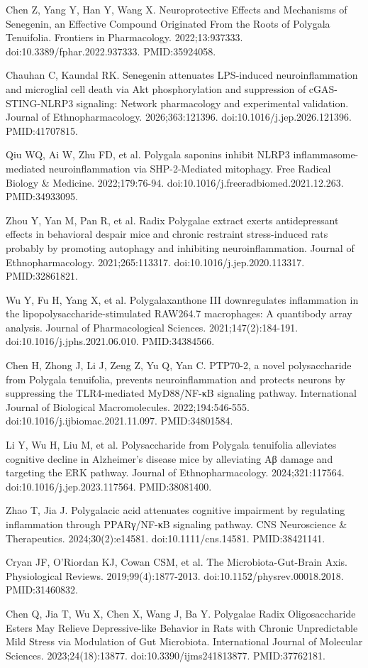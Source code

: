 \documentclass[11pt,oneside]{book}
\newcommand{\reff}[2]{\par\hangindent=7mm\hangafter=1\noindent[#1]\hspace{2mm}#2\par}
\begin{document}
\reff{12}{Chen Z, Yang Y, Han Y, Wang X. Neuroprotective Effects and Mechanisms of Senegenin, an Effective Compound Originated From the Roots of Polygala Tenuifolia. Frontiers in Pharmacology. 2022;13:937333. doi:10.3389/fphar.2022.937333. PMID:35924058.}
\reff{13}{Chauhan C, Kaundal RK. Senegenin attenuates LPS-induced neuroinflammation and microglial cell death via Akt phosphorylation and suppression of cGAS-STING-NLRP3 signaling: Network pharmacology and experimental validation. Journal of Ethnopharmacology. 2026;363:121396. doi:10.1016/j.jep.2026.121396. PMID:41707815.}
\reff{14}{Qiu WQ, Ai W, Zhu FD, et al. Polygala saponins inhibit NLRP3 inflammasome-mediated neuroinflammation via SHP-2-Mediated mitophagy. Free Radical Biology \& Medicine. 2022;179:76-94. doi:10.1016/j.freeradbiomed.2021.12.263. PMID:34933095.}
\reff{15}{Zhou Y, Yan M, Pan R, et al. Radix Polygalae extract exerts antidepressant effects in behavioral despair mice and chronic restraint stress-induced rats probably by promoting autophagy and inhibiting neuroinflammation. Journal of Ethnopharmacology. 2021;265:113317. doi:10.1016/j.jep.2020.113317. PMID:32861821.}
\reff{16}{Wu Y, Fu H, Yang X, et al. Polygalaxanthone III downregulates inflammation in the lipopolysaccharide-stimulated RAW264.7 macrophages: A quantibody array analysis. Journal of Pharmacological Sciences. 2021;147(2):184-191. doi:10.1016/j.jphs.2021.06.010. PMID:34384566.}
\reff{17}{Chen H, Zhong J, Li J, Zeng Z, Yu Q, Yan C. PTP70-2, a novel polysaccharide from Polygala tenuifolia, prevents neuroinflammation and protects neurons by suppressing the TLR4-mediated MyD88/NF-κB signaling pathway. International Journal of Biological Macromolecules. 2022;194:546-555. doi:10.1016/j.ijbiomac.2021.11.097. PMID:34801584.}
\reff{18}{Li Y, Wu H, Liu M, et al. Polysaccharide from Polygala tenuifolia alleviates cognitive decline in Alzheimer's disease mice by alleviating Aβ damage and targeting the ERK pathway. Journal of Ethnopharmacology. 2024;321:117564. doi:10.1016/j.jep.2023.117564. PMID:38081400.}
\reff{19}{Zhao T, Jia J. Polygalacic acid attenuates cognitive impairment by regulating inflammation through PPARγ/NF-κB signaling pathway. CNS Neuroscience \& Therapeutics. 2024;30(2):e14581. doi:10.1111/cns.14581. PMID:38421141.}
\reff{20}{Cryan JF, O'Riordan KJ, Cowan CSM, et al. The Microbiota-Gut-Brain Axis. Physiological Reviews. 2019;99(4):1877-2013. doi:10.1152/physrev.00018.2018. PMID:31460832.}
\reff{21}{Chen Q, Jia T, Wu X, Chen X, Wang J, Ba Y. Polygalae Radix Oligosaccharide Esters May Relieve Depressive-like Behavior in Rats with Chronic Unpredictable Mild Stress via Modulation of Gut Microbiota. International Journal of Molecular Sciences. 2023;24(18):13877. doi:10.3390/ijms241813877. PMID:37762181.}
\end{document}
